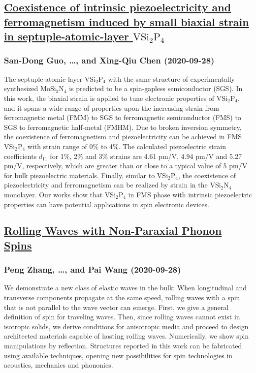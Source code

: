 \subsection*{\href{http://arxiv.org/abs/2009.13022v1}{Coexistence of intrinsic piezoelectricity and ferromagnetism induced by  small biaxial strain in septuple-atomic-layer $\mathrm{VSi_2P_4}$}}
\subsubsection*{San-Dong Guo, \dots, and Xing-Qiu Chen (2020-09-28)}
The septuple-atomic-layer $\mathrm{VSi_2P_4}$ with the same structure of
experimentally synthesized $\mathrm{MoSi_2N_4}$ is predicted to be a
spin-gapless semiconductor (SGS). In this work, the biaxial strain is applied
to tune electronic properties of $\mathrm{VSi_2P_4}$, and it spans a wide range
of properties upon the increasing strain from ferromagnetic metal (FMM) to SGS
to ferromagnetic semiconductor (FMS) to SGS to ferromagnetic half-metal (FMHM).
Due to broken inversion symmetry, the coexistence of ferromagnetism and
piezoelectricity can be achieved in FMS $\mathrm{VSi_2P_4}$ with strain range
of 0\% to 4\%. The calculated piezoelectric strain coefficients $d_{11}$ for
1\%, 2\% and 3\% strains are 4.61 pm/V, 4.94 pm/V and 5.27 pm/V, respectively,
which are greater than or close to a typical value of 5 pm/V for bulk
piezoelectric materials. Finally, similar to $\mathrm{VSi_2P_4}$, the
coexistence of piezoelectricity and ferromagnetism can be realized by strain in
the $\mathrm{VSi_2N_4}$ monolayer. Our works show that $\mathrm{VSi_2P_4}$ in
FMS phase with intrinsic piezoelectric properties can have potential
applications in spin electronic devices.

\subsection*{\href{http://arxiv.org/abs/2009.13014v1}{Rolling Waves with Non-Paraxial Phonon Spins}}
\subsubsection*{Peng Zhang, \dots, and Pai Wang (2020-09-28)}
We demonstrate a new class of elastic waves in the bulk: When longitudinal
and transverse components propagate at the same speed, rolling waves with a
spin that is not parallel to the wave vector can emerge. First, we give a
general definition of spin for traveling waves. Then, since rolling waves
cannot exist in isotropic solids, we derive conditions for anisotropic media
and proceed to design architected materials capable of hosting rolling waves.
Numerically, we show spin manipulations by reflection. Structures reported in
this work can be fabricated using available techniques, opening new
possibilities for spin technologies in acoustics, mechanics and phononics.

